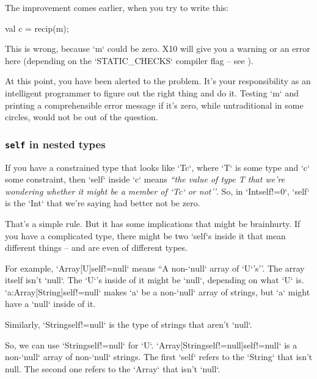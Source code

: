 \begin{description}
      The improvement comes earlier, when you try to write this: 
\begin{xten}
    val c = recip(m); 
\end{xten}
      This is wrong, because \xcd`m` could be zero.  
      X10 will give you a warning or an error here (depending on the 
      \xcd`STATIC_CHECKS` compiler flag -- see ).  

      At this point, you have been alerted to the problem. It's your
      responsibility as an intelligent programmer to figure out the right
      thing and do it.  Testing \xcd`m` and printing a comprehensible error
      message if it's zero, while untraditional in some circles, would not be
      out of the question.

\end{description}

\subsubsection{{\tt self} in nested types}

If you have a constrained type that looks like \xcd`T{c}`, where \xcd`T` is
some type and \xcd`c` some constraint, then \xcd`self` inside \xcd`c` means
{\em ``the value of type T that we're wondering whether it might be a member
of \xcd`T{c}` or not''}.  So, in \xcd`Int{self!=0}`, \xcd`self` is the
\xcd`Int` that we're saying had better not be zero.

That's a simple rule.  But it has some implications that might be brainhurty.
If you have a complicated type, there might be two \xcd`self`s inside it that
mean different things -- and are even of different types.

For example, \xcd`Array[U]{self!=null}` means ``A non-\xcd`null` array of
\xcd`U`'s''. The array itself isn't \xcd`null`. The \xcd`U`'s inside of it
might be \xcd`null`, depending on what \xcd`U` is.
\xcd`a:Array[String]{self!=null}` makes \xcd`a` be a non-\xcd`null` array of
strings, but \xcd`a` might have a \xcd`null` inside of it.

Similarly, \xcd`String{self!=null}` is the type of strings that aren't
\xcd`null`.  

So, we can use \xcd`String{self!=null}` for \xcd`U`.  
\xcd`Array[String{self!=null}]{self!=null}` is a non-\xcd`null` array of
non-\xcd`null` strings.  The first \xcd`self` refers to the \xcd`String` that
isn't null. The second one refers to the \xcd`Array` that isn't \xcd`null`.

